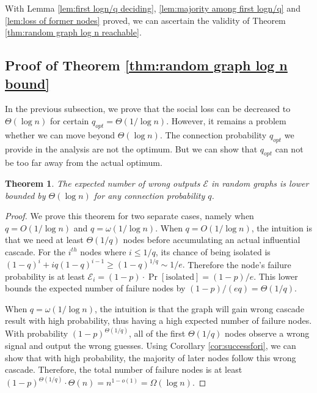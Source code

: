 \documentclass[a4paper,UKenglish]{lipics}
\newtheorem{thm}{Theorem}[section] %
\theoremstyle{definition}
\begin{document}
With Lemma \ref{lem:first logn/q deciding}, \ref{lem:majority among first logn/q} and \ref{lem:loss of former nodes} proved,
	we can ascertain the validity of Theorem \ref{thm:random graph log n reachable}.



\subsection {Proof of Theorem \ref{thm:random graph log n bound}}
In the previous subsection, we prove that the social loss can be decreased to $\Theta(\log n)$ for certain $q_{opt} = \Theta(1 / \log n)$.
However, it remains a problem whether we can move beyond $\Theta(\log n)$.
The connection probability $q_{opt}$ we provide in the analysis are not the optimum.
But we can show that $q_{opt}$ can not be too far away from the actual optimum.
\begin{thm}
The expected number of wrong outputs $\mathcal{E}$ in random graphs is lower bounded by $\Theta(\log n)$ for any connection probability $q$.
\end{thm}
\begin{proof}
We prove this theorem for two separate cases, namely when $q = O(1 / \log n)$ and $q = \omega(1 / \log n)$. 
When $q = O(1 / \log n)$, the intuition is that we need at least $\Theta(1/q)$ nodes before accumulating an actual influential cascade.
For the $i^{th}$ nodes where $i \le 1/q$, its chance of being isolated is 
$
	(1 - q)^{i} + iq(1-q)^{i-1}
\ge
	(1 - q)^{1 / q}
\sim
	{1 / e}.
$
Therefore the node's failure probability is at least $\mathcal{E}_i = (1-p)\cdot\Pr[\text{isolated}] = (1-p)/e$.
This lower bounds the expected number of failure nodes by $(1-p)/(eq) = \Theta(1/q)$.

When $q = \omega(1 / \log n)$, 
	the intuition is that the graph will gain wrong cascade result with high probability,
	thus having a high expected number of failure nodes.
With probability $(1-p)^{\Theta(1/q)}$, all of the first $\Theta(1/q)$ nodes observe a wrong signal and output the wrong guesses.
Using Corollary \ref{cor:successfori}, we can show that with high probability, the majority of later nodes follow this wrong cascade.
Therefore, the total number of failure nodes is at least
$
(1-p)^{\Theta(1/q)}\cdot \Theta(n) = n^{1 - o(1)} = \Omega(\log n).
$
\end{proof}
\end{document}
